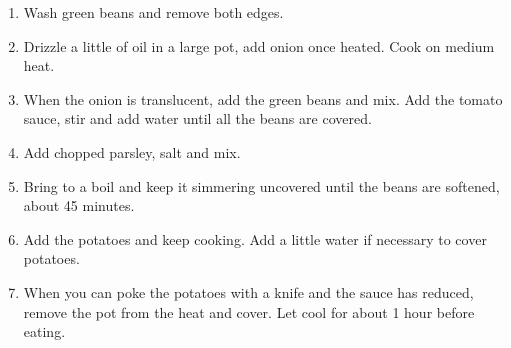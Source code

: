 \begin{enumerate}
    \item Wash green beans and remove both edges.
    \item Drizzle a little of oil in a large pot, add onion once heated. Cook on medium heat.
    \item When the onion is translucent, add the green beans and mix. Add the tomato sauce, stir and add water until all the beans are covered.
    \item Add chopped parsley, salt and mix.
    \item Bring to a boil and keep it simmering uncovered until the beans are softened, about 45 minutes.
    \item Add the potatoes and keep cooking. Add a little water if necessary to cover potatoes.
    \item When you can poke the potatoes with a knife and the sauce has reduced, remove the pot from the heat and cover. Let cool for about 1 hour before eating.
\end{enumerate}


